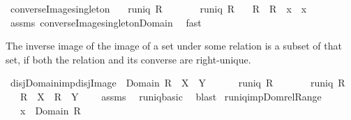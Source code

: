\begin{isabellebody}
\isamarkuptrue%
\isamarkupfalse%
\ converse{\isacharunderscore}Image{\isacharunderscore}singleton{\isacharcolon}\isanewline
\ \ \ {\isachardoublequoteopen}runiq\ R{\isachardoublequoteclose}\isanewline
\ \ \ \ \ \ \ {\isachardoublequoteopen}runiq\ {\isacharparenleft}R{\isasyminverse}{\isacharparenright}{\isachardoublequoteclose}\isanewline
\ \ \ {\isachardoublequoteopen}R{\isasyminverse}\ {\isacharbackquote}{\isacharbackquote}\ R\ {\isacharbackquote}{\isacharbackquote}\ {\isacharbraceleft}x{\isacharbraceright}\ {\isasymsubseteq}\ {\isacharbraceleft}x{\isacharbraceright}{\isachardoublequoteclose}\isanewline
%
\isadelimproof
%
\endisadelimproof
%
\isatagproof
{}\isamarkupfalse%
\ assms\ converse{\isacharunderscore}Image{\isacharunderscore}singleton{\isacharunderscore}Domain\ \isamarkupfalse%
\ fast%
\endisatagproof
{\isafoldproof}%
%
\isadelimproof
%
\endisadelimproof
%
\begin{isamarkuptext}%
The inverse image of the image of a set under some relation is a subset of that set,
  if both the relation and its converse are right-unique.%
\end{isamarkuptext}%
\isamarkuptrue%
\isamarkupfalse%
\ disj{\isacharunderscore}Domain{\isacharunderscore}imp{\isacharunderscore}disj{\isacharunderscore}Image{\isacharcolon}\ \ {\isachardoublequoteopen}Domain\ R\ {\isasyminter}\ X\ {\isasyminter}\ Y\ {\isacharequal}\ {\isacharbraceleft}{\isacharbraceright}{\isachardoublequoteclose}\ \isanewline
\ \ \ {\isachardoublequoteopen}runiq\ R{\isachardoublequoteclose}\isanewline
\ \ \ \ \ \ \ {\isachardoublequoteopen}runiq\ {\isacharparenleft}R{\isasyminverse}{\isacharparenright}{\isachardoublequoteclose}\isanewline
\ \ \ {\isachardoublequoteopen}R\ {\isacharbackquote}{\isacharbackquote}\ X\ {\isasyminter}\ R\ {\isacharbackquote}{\isacharbackquote}\ Y\ {\isacharequal}\ {\isacharbraceleft}{\isacharbraceright}{\isachardoublequoteclose}\ \isanewline
%
\isadelimproof
%
\endisadelimproof
%
\isatagproof
{}\isamarkupfalse%
\ assms\ \isamarkupfalse%
\ runiq{\isacharunderscore}basic\ \isamarkupfalse%
\ blast%
\endisatagproof
{\isafoldproof}%
%
\isadelimproof
\isanewline
%
\endisadelimproof
\isanewline
{}\isamarkupfalse%
\ runiq{\isacharunderscore}imp{\isacharunderscore}Dom{\isacharunderscore}rel{\isacharunderscore}Range{\isacharcolon}\isanewline
\ \ \ {\isachardoublequoteopen}x\ {\isasymin}\ Domain\ R{\isachardoublequoteclose}\isanewline

\end{isabellebody}
